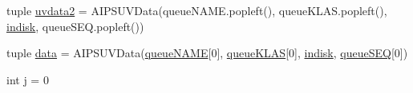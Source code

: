 \begin{DoxyCompactItemize}
\item 
tuple \hyperlink{namespacee_m_e_r_l_i_n__dbcon_af2aa3e117609642e2b32301d834da77b}{uvdata2} = \-A\-I\-P\-S\-U\-V\-Data(queue\-N\-A\-M\-E.\-popleft(), queue\-K\-L\-A\-S.\-popleft(), \hyperlink{namespacee_m_e_r_l_i_n__dbcon_a3b3d57aefde6e9d540ecb3801fac5664}{indisk}, queue\-S\-E\-Q.\-popleft())
\item 
tuple \hyperlink{namespacee_m_e_r_l_i_n__dbcon_a04e130b43c6df2215bebc23fa9dca4b1}{data} = \-A\-I\-P\-S\-U\-V\-Data(\hyperlink{namespacee_m_e_r_l_i_n__dbcon_a7d3a6f07cf87a01be51860872f9299f4}{queue\-N\-A\-M\-E}\mbox{[}0\mbox{]}, \hyperlink{namespacee_m_e_r_l_i_n__dbcon_a486d24d9ef703df2acee99e4e3817adb}{queue\-K\-L\-A\-S}\mbox{[}0\mbox{]}, \hyperlink{namespacee_m_e_r_l_i_n__dbcon_a3b3d57aefde6e9d540ecb3801fac5664}{indisk}, \hyperlink{namespacee_m_e_r_l_i_n__dbcon_a0e55c34dc1aa2bca11dd0c616d8ece31}{queue\-S\-E\-Q}\mbox{[}0\mbox{]})
\item 
int \hyperlink{namespacee_m_e_r_l_i_n__dbcon_a62b3c7f92b7b6c06d24b9c76e31aa4e7}{j} = 0
\end{DoxyCompactItemize}


